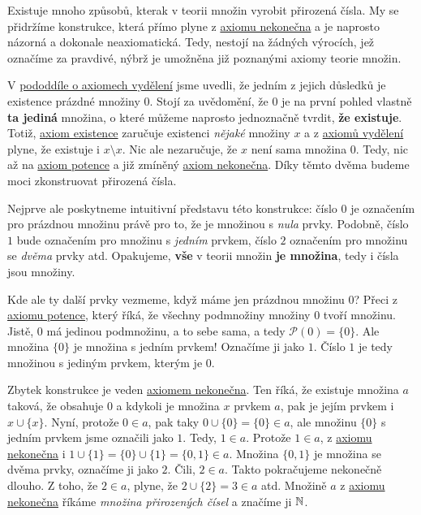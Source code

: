 Existuje mnoho způsobů, kterak v teorii množin vyrobit přirozená čísla. My se
přidržíme konstrukce, která přímo plyne z \hyperref[eq:axiom-nekonecna]{axiomu
nekonečna} a je naprosto názorná a dokonale neaxiomatická. Tedy, nestojí na
žádných výrocích, jež označíme za pravdivé, nýbrž je umožněna již poznanými
axiomy teorie množin.

V \hyperref[ssec:axiomy-vydeleni]{pododdíle o axiomech vydělení} jsme uvedli, že
jedním z jejich důsledků je existence prázdné množiny $0$. Stojí za uvědomění,
že $0$ je na první pohled vlastně \textbf{ta jediná} množina, o které můžeme
naprosto jednoznačně tvrdit, \textbf{že existuje}. Totiž,
\hyperref[eq:axiom-existence]{axiom existence} zaručuje existenci \emph{nějaké}
množiny $x$ a z \hyperref[eq:axiom-vydeleni]{axiomů vydělení} plyne, že existuje
i $x \setminus x$. Nic ale nezaručuje, že $x$ není sama množina $0$. Tedy, nic
až na \hyperref[eq:axiom-potence]{axiom potence} a již zmíněný
\hyperref[eq:axiom-nekonecna]{axiom nekonečna}. Díky těmto dvěma budeme moci
zkonstruovat přirozená čísla.

Nejprve ale poskytneme intuitivní představu této konstrukce: číslo $0$ je
označením pro prázdnou množinu právě pro to, že je množinou s \emph{nula}
prvky. Podobně, číslo $1$ bude označením pro množinu s \emph{jedním} prvkem,
číslo $2$ označením pro množinu se \emph{dvěma} prvky atd. Opakujeme,
\textbf{vše} v teorii množin \textbf{je množina}, tedy i čísla jsou množiny.

Kde ale ty další prvky vezmeme, když máme jen prázdnou množinu $0$? Přeci z
\hyperref[eq:axiom-potence]{axiomu potence}, který říká, že všechny podmnožiny
množiny $0$ tvoří množinu. Jistě, $0$ má jedinou podmnožinu, a to sebe sama, a
tedy $\mathcal{P}(0) = \{0\}$. Ale množina $\{0\}$ je množina s jedním prvkem!
Označíme ji jako $1$. Číslo $1$ je tedy množinou s jediným prvkem, kterým je
$0$.

Zbytek konstrukce je veden \hyperref[eq:axiom-nekonecna]{axiomem nekonečna}. Ten
říká, že existuje množina $a$ taková, že obsahuje $0$ a kdykoli je množina $x$
prvkem $a$, pak je jejím prvkem i $x \cup \{x\}$. Nyní, protože $0 \in a$, pak
taky $0 \cup \{0\} = \{0\} \in a$, ale množinu $\{0\}$ s jedním prvkem jsme
označili jako $1$. Tedy, $1 \in a$. Protože $1 \in a$, z
\hyperref[eq:axiom-nekonecna]{axiomu nekonečna} i $1 \cup \{1\} = \{0\} \cup
\{1\} = \{0, 1\} \in a$. Množina $\{0, 1\}$ je množina se dvěma prvky, označíme
ji jako $2$. Čili, $2 \in a$. Takto pokračujeme nekonečně dlouho. Z toho, že
$2 \in a$, plyne, že $2 \cup \{2\} = 3 \in a$ atd. Množině $a$ z
\hyperref[eq:axiom-nekonecna]{axiomu nekonečna} říkáme \emph{množina přirozených
čísel} a značíme ji $\mathbb{N}$.

